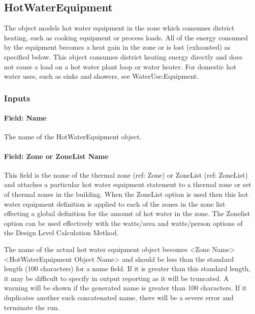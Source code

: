 \subsection{HotWaterEquipment}\label{hotwaterequipment}

The object models hot water equipment in the zone which consumes district heating, such as cooking equipment or process loads. All of the energy consumed by the equipment becomes a heat gain in the zone or is lost (exhausted) as specified below. This object consumes district heating energy directly and does not cause a load on a hot water plant loop or water heater. For domestic hot water uses, such as sinks and showers, see WaterUse:Equipment.

\subsubsection{Inputs}\label{inputs-5-015}

\paragraph{Field: Name}\label{field-name-5-011}

The name of the HotWaterEquipment object.

\paragraph{Field: Zone or ZoneList Name}\label{field-zone-or-zonelist-name-4}

This field is the name of the thermal zone (ref: Zone) or ZoneList (ref: ZoneList) and attaches a particular hot water equipment statement to a thermal zone or set of thermal zones in the building. When the ZoneList option is used then this hot water equipment definition is applied to each of the zones in the zone list effecting a global definition for the amount of hot water in the zone. The Zonelist option can be used effectively with the watts/area and watts/person options of the Design Level Calculation Method.

The name of the actual hot water equipment object becomes \textless{}Zone Name\textgreater{} \textless{}HotWaterEquipment Object Name\textgreater{} and should be less than the standard length (100 characters) for a name field. If it is greater than this standard length, it may be difficult to specify in output reporting as it will be truncated. A warning will be shown if the generated name is greater than 100 characters. If it duplicates another such concatenated name, there will be a severe error and terminate the run.

